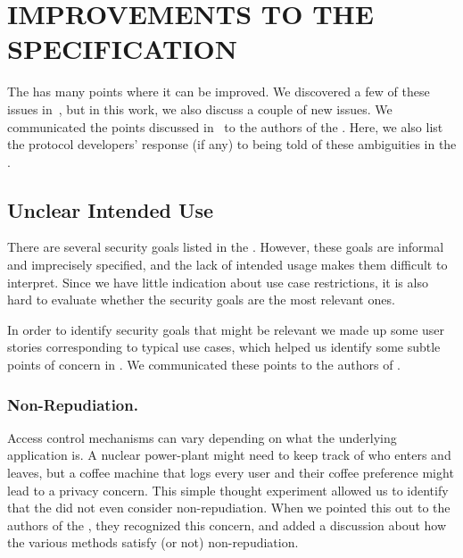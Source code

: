 \documentclass[runningheads]{llncs}
\begin{document}
\section{\uppercase{Improvements to the Specification}}
\label{sec:discussion}
The \mEdhoc{} \mSpec{} has many points where it can be improved.
%
We discovered a few of these issues in~\cite{Norr21}, but in this work,
we also discuss a couple of new issues.
%
We communicated the points discussed in~\cite{Norr21} to the authors of the
\mSpec{}.
%
Here, we also list the protocol developers' response (if any) to being told of these
ambiguities in the \mSpec{}.

\subsection{Unclear Intended Use}
\label{sec:unclearProtocolUse}
%
There are several security goals listed in the \mSpec{}.
%
However, these goals are informal and imprecisely specified, and the lack of
intended usage makes them difficult to interpret.
%
Since we have little indication about use case restrictions, it is also hard
to evaluate whether the security goals are the most relevant ones.
%

In order to identify security goals that might be relevant
we made up some user stories corresponding to typical use cases,
which helped us identify some subtle points of concern in \mEdhoc.
%
We communicated these points to the authors of \mEdhoc{}.
%

\subsubsection{Non-Repudiation.}
Access control mechanisms can vary depending on what the underlying application
is.
%
A nuclear power-plant might need to keep track of who enters and leaves, but a
coffee machine that logs every user and their coffee preference might lead to a
privacy concern.
%
This simple thought experiment allowed us to identify that the \mEdhoc{}
\mSpec{} did not even consider non-repudiation.
%
When we pointed this out to the authors of the \mSpec, they recognized this
concern, and added a discussion about how the various \mEdhoc{} methods
satisfy (or not) non-repudiation.
%
\end{document}
